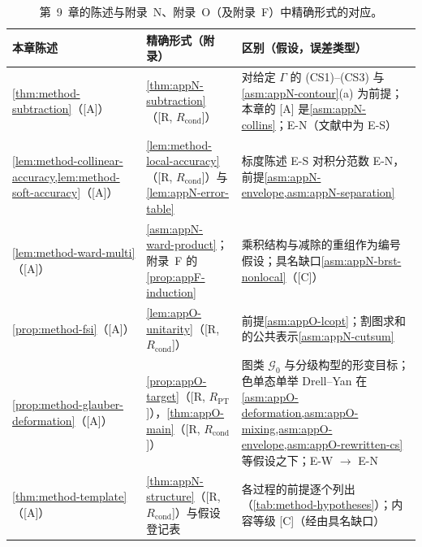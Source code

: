 \begin{table}[htbp]
\centering
\footnotesize
\renewcommand{\arraystretch}{1.3}
\begin{tabularx}{\textwidth}{@{}>{\raggedright\arraybackslash}p{3.6cm}>{\raggedright\arraybackslash}p{3.9cm}>{\raggedright\arraybackslash}X@{}}
\toprule
本章陈述 & 精确形式（附录） & 区别（假设，误差类型）\\
\midrule
\cref{thm:method-subtraction}（[A]） & \cref{thm:appN-subtraction}（[R, $R_{\mathrm{cond}}$]） & 对给定 $\Gamma$ 的 (CS1)--(CS3) 与\cref{asm:appN-contour}(a) 为前提；本章的 [A] 是\cref{asm:appN-collins}；E-N（文献中为 E-S）\\
\cref{lem:method-collinear-accuracy,lem:method-soft-accuracy}（[A]） & \cref{lem:method-local-accuracy}（[R, $R_{\mathrm{cond}}$]）与\cref{lem:appN-error-table} & 标度陈述 E-S 对积分范数 E-N，前提\cref{asm:appN-envelope,asm:appN-separation}\\
\cref{lem:method-ward-multi}（[A]） & \cref{asm:appN-ward-product}；附录~F 的\cref{prop:appF-induction} & 乘积结构与减除的重组作为编号假设；具名缺口\cref{asm:appN-brst-nonlocal}（[C]）\\
\cref{prop:method-fsi}（[A]） & \cref{lem:appO-unitarity}（[R, $R_{\mathrm{cond}}$]） & 前提\cref{asm:appO-lcopt}；割图求和的公共表示\cref{asm:appN-cutsum}\\
\cref{prop:method-glauber-deformation}（[A]） & \cref{prop:appO-target}（[R, $R_{\mathrm{PT}}$]），\cref{thm:appO-main}（[R, $R_{\mathrm{cond}}$]） & 图类 $\mathcal G_0$ 与分级构型的形变目标；色单态单举 Drell--Yan 在\cref{asm:appO-deformation,asm:appO-mixing,asm:appO-envelope,asm:appO-rewritten-cs}等假设之下；E-W $\to$ E-N\\
\cref{thm:method-template}（[A]） & \cref{thm:appN-structure}（[R, $R_{\mathrm{cond}}$]）与假设登记表 & 各过程的前提逐个列出（\cref{tab:method-hypotheses}）；内容等级 [C]（经由具名缺口）\\
\bottomrule
\end{tabularx}
\caption{第~9~章的陈述与附录~N、附录~O（及附录~F）中精确形式的对应。}
\label{tab:method-correspondence}
\end{table}
